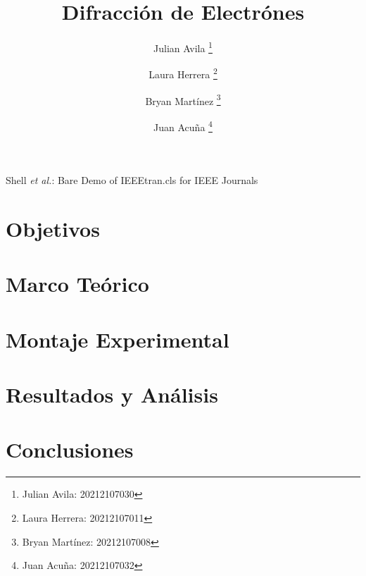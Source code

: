 \documentclass[journal, table]{IEEEtran}
\begin{document}
\title{Difracción de Electrónes}

\author[*]{Julian Avila
  \thanks{Julian Avila: 20212107030}}
\author[*]{Laura Herrera
  \thanks{Laura Herrera: 20212107011}}
\author[*]{Bryan Martínez
  \thanks{Bryan Martínez: 20212107008}}
\author[*]{Juan Acuña
  \thanks{Juan Acuña: 20212107032}}


\markboth{}
{Shell \MakeLowercase{\textit{et al.}}: Bare Demo of IEEEtran.cls for IEEE Journals}

\maketitle



\section{Objetivos}


\section{Marco Teórico}


\section{Montaje Experimental}


\section{Resultados y Análisis}


\section{Conclusiones}


\printbibliography
\end{document}
